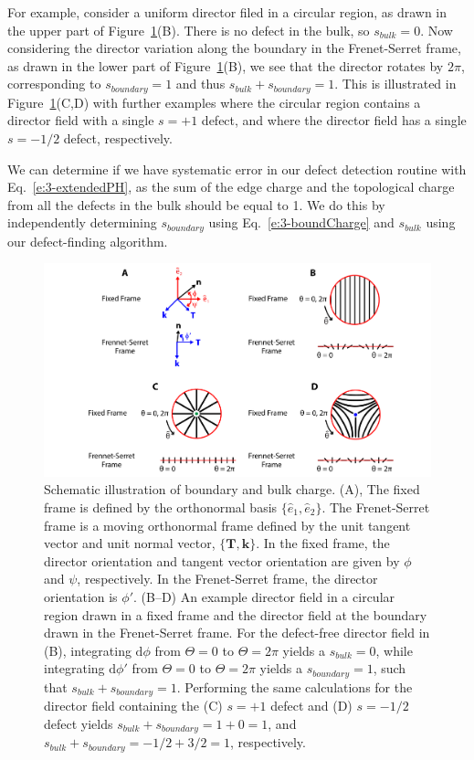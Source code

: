 For example, consider a uniform director filed in a circular region, as drawn in the upper part of Figure~\ref{f:3-EdgeChargeEx}(B).
There is no defect in the bulk, so $s_{bulk} = 0$.
Now considering the director variation along the boundary in the Frenet-Serret frame, as drawn in the lower part of Figure~\ref{f:3-EdgeChargeEx}(B), we see that the director rotates by $2 \pi$, corresponding to $s_{boundary} = 1$ and thus $s_{bulk} + s_{boundary} = 1$.
This is illustrated in Figure~\ref{f:3-EdgeChargeEx}(C,D) with further examples where the circular region contains a director field with a single $s = +1$ defect, and where the director field has a single $s=-1/2$ defect, respectively.

We can determine if we have systematic error in our defect detection routine with Eq.~\ref{e:3-extendedPH}, as the sum of the edge charge and the topological charge from all the defects in the bulk should be equal to 1.
We do this by independently determining $s_{boundary}$ using Eq.~\ref{e:3-boundCharge} and $s_{bulk}$ using our defect-finding algorithm.
\begin{figure}
  \centering
  \includegraphics{figures/C3/Ch3-Figs_EdgeChargeEx.png}
  \caption{Schematic illustration of boundary and bulk charge.
  (A), The fixed frame is defined by the orthonormal basis $\{\hat{e}_1, \hat{e}_2 \}$.
  The Frenet-Serret frame is a moving orthonormal frame defined by the unit tangent vector and unit normal vector, $\{\mathbf{T}, \mathbf{k}\}$.
  In the fixed frame, the director orientation and tangent vector orientation are given by $\phi$ and $\psi$, respectively.
  In the Frenet-Serret frame, the director orientation is $\phi'$.
  (B--D) An example director field in a circular region drawn in a fixed frame and the director field at the boundary drawn in the Frenet-Serret frame.
  For the defect-free director field in (B), integrating $\textrm{d}\phi$ from $\Theta = 0$ to $\Theta = 2\pi$ yields a $s_{bulk} = 0$, while integrating $\textrm{d}\phi'$ from $\Theta = 0$ to $\Theta = 2\pi$ yields a $s_{boundary} = 1$, such that $s_{bulk} + s_{boundary}=1$.
  Performing the same calculations for the director field containing the (C) $s = +1$ defect and (D) $s = -1/2$ defect yields $s_{bulk} + s_{boundary}= 1 + 0= 1$, and $s_{bulk} + s_{boundary}= -1/2 + 3/2 = 1$, respectively.}\label{f:3-EdgeChargeEx}
\end{figure}


